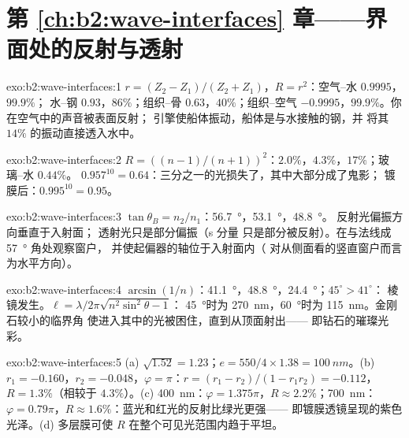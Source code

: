 \section*{第 \ref{ch:b2:wave-interfaces} 章——界面处的反射与透射}

\begin{solution}{exo:b2:wave-interfaces:1}
$r = (Z_2 - Z_1)/(Z_2 + Z_1)$，$R = r^2$：空气–水 $0.9995$，$99.9\%$；
水–钢 $0.93$，$86\%$；组织–骨 $0.63$，$40\%$；组织–空气
$-0.9995$，$99.9\%$。你在空气中的声音被表面反射；
引擎使船体振动，船体是与水接触的钢，并
将其 $14\%$ 的振动直接透入水中。
\end{solution}

\begin{solution}{exo:b2:wave-interfaces:2}
$R = ((n - 1)/(n + 1))^2$：$2.0\%$，$4.3\%$，$17\%$；玻璃–水 $0.44\%$。
$0.957^{10} = 0.64$：三分之一的光损失了，其中大部分成了鬼影；
镀膜后：$0.995^{10} = 0.95$。
\end{solution}

\begin{solution}{exo:b2:wave-interfaces:3}
$\tan\theta_B = n_2/n_1$：\qty{56.7}{\degree}，\qty{53.1}{\degree}，\qty{48.8}{\degree}。
反射光偏振方向垂直于入射面；
透射光只是部分偏振（s 分量
只是部分被反射）。在与法线成 \qty{57}{\degree} 角处观察窗户，
并使起偏器的轴位于入射面内（
对从侧面看的竖直窗户而言为水平方向）。
\end{solution}

\begin{solution}{exo:b2:wave-interfaces:4}
$\arcsin(1/n)$：\qty{41.1}{\degree}，\qty{48.8}{\degree}，\qty{24.4}{\degree}；$45^\circ > 41^\circ$：
棱镜发生。$\ell = \lambda/2\pi\sqrt{n^2\sin^2\theta - 1}$：
\qty{45}{\degree}时为 \qty{270}{nm}，\qty{60}{\degree}时为 \qty{115}{nm}。金刚石较小的临界角
使进入其中的光被困住，直到从顶面射出——
即钻石的璀璨光彩。
\end{solution}

\begin{solution}{exo:b2:wave-interfaces:5}
(a) $\sqrt{1.52} = 1.23$；$e = 550/4 \times 1.38 = \qty{100}{nm}$。(b) $r_1 = -0.160$，$r_2 =
-0.048$，$\varphi = \pi$：$r = (r_1 - r_2)/(1 - r_1r_2) = -0.112$，$R = 1.3\%$（相较于
$4.3\%$）。(c) \qty{400}{nm}：$\varphi = 1.375\pi$，$R \approx 2.2\%$；\qty{700}{nm}：$\varphi =
0.79\pi$，$R \approx 1.6\%$：蓝光和红光的反射比绿光更强——
即镀膜透镜呈现的紫色光泽。(d) 多层膜可使 $R$
在整个可见光范围内趋于平坦。
\end{solution}

